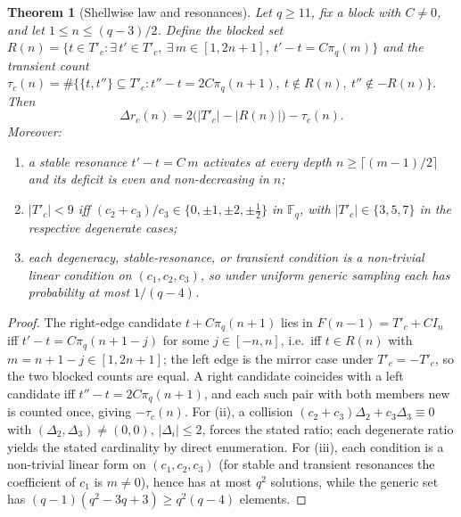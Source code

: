 \documentclass[11pt,a4paper]{article}
\theoremstyle{plain}
\newtheorem{theorem}{Theorem}
\theoremstyle{definition}
\newcommand{\Tp}{T'_c}
\begin{document}
    \begin{theorem}[Shellwise law and resonances]
      \label{thm:shellwise}
      Let $q\ge11$, fix a block with $C \ne 0$, and let $1 \le n \le (q-3)/2$.
      Define the blocked set
      $R(n) = \{t \in \Tp : \exists\,t' \in \Tp,\ \exists\,m \in [1, 2n+1],\ t'-t = C\pi_q(m)\}$
      and the transient count
      $\tau_c(n) = \#\{\{t,t''\} \subseteq \Tp : t''-t = 2C\pi_q(n+1),\ t \notin R(n),\
      t'' \notin -R(n)\}$.
      Then
      \begin{equation}
        \Delta r_c(n) = 2\bigl(\lvert\Tp\rvert - \lvert R(n)\rvert\bigr) - \tau_c(n).
        \label{eq:shellwise}
      \end{equation}
      Moreover:
      \begin{enumerate}[nosep]
        \item a stable resonance $t'-t = C\,m$ activates at every depth
          $n \ge \lceil (m-1)/2 \rceil$ and its deficit is even and non-decreasing in $n$;
        \item $\lvert\Tp\rvert < 9$ iff $(c_2+c_3)/c_3 \in \{0, \pm 1, \pm 2, \pm\tfrac12\}$ in
          $\mathbb{F}_q$, with $\lvert\Tp\rvert \in \{3, 5, 7\}$ in the respective degenerate
          cases;
        \item each degeneracy, stable-resonance, or transient condition is a non-trivial linear
          condition on $(c_1,c_2,c_3)$, so under uniform generic sampling each has probability at
          most $1/(q-4)$.
      \end{enumerate}
    \end{theorem}

    \begin{proof}
      The right-edge candidate $t + C\pi_q(n+1)$ lies in $F(n-1) = \Tp + C I_n$ iff
      $t'-t = C\pi_q(n+1-j)$ for some $j \in [-n,n]$, i.e.\ iff $t \in R(n)$ with
      $m = n+1-j \in [1, 2n+1]$; the left edge is the mirror case under $\Tp = -\Tp$, so the two
      blocked counts are equal.
      A right candidate coincides with a left candidate iff $t''-t = 2C\pi_q(n+1)$, and each such
      pair with both members new is counted once, giving $-\tau_c(n)$.
      For (ii), a collision $(c_2+c_3)\Delta_2 + c_3\Delta_3 \equiv 0$ with
      $(\Delta_2,\Delta_3) \ne (0,0)$, $\lvert\Delta_i\rvert \le 2$, forces the stated ratio; each
      degenerate ratio yields the stated cardinality by direct enumeration.
      For (iii), each condition is a non-trivial linear form on $(c_1,c_2,c_3)$ (for stable and
      transient resonances the coefficient of $c_1$ is $m \ne 0$), hence has at most $q^2$
      solutions, while the generic set has $(q-1)(q^2-3q+3) \ge q^2(q-4)$ elements.
    \end{proof}
\end{document}
